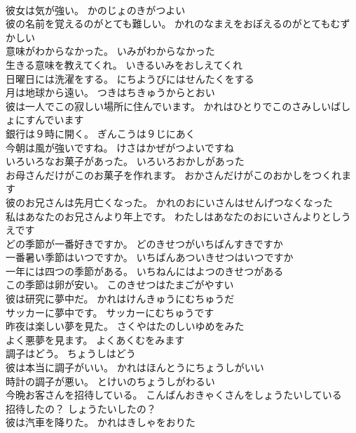 \documentclass[8pt]{extreport}
\begin{document}
\begin{CJK}{UTF8}{min}
\\	彼女は気が強い。	かのじょのきがつよい 
\\	彼の名前を覚えるのがとても難しい。	かれのなまえをおぼえるのがとてもむずかしい 
\\	意味がわからなかった。	いみがわからなかった 
\\	生きる意味を教えてくれ。	いきるいみをおしえてくれ 
\\	日曜日には洗濯をする。	にちようびにはせんたくをする 
\\	月は地球から遠い。	つきはちきゅうからとおい 
\\	彼は一人でこの寂しい場所に住んでいます。	かれはひとりでこのさみしいばしょにすんでいます 
\\	銀行は９時に開く。	ぎんこうは９じにあく 
\\	今朝は風が強いですね。	けさはかぜがつよいですね 
\\	いろいろなお菓子があった。	いろいろおかしがあった 
\\	お母さんだけがこのお菓子を作れます。	おかさんだけがこのおかしをつくれます 
\\	彼のお兄さんは先月亡くなった。	かれのおにいさんはせんげつなくなった 
\\	私はあなたのお兄さんより年上です。	わたしはあなたのおにいさんよりとしうえです 
\\	どの季節が一番好きですか。	どのきせつがいちばんすきですか 
\\	一番暑い季節はいつですか。	いちばんあついきせつはいつですか 
\\	一年には四つの季節がある。	いちねんにはよつのきせつがある 
\\	この季節は卵が安い。	このきせつはたまごがやすい 
\\	彼は研究に夢中だ。	かれはけんきゅうにむちゅうだ 
\\	サッカーに夢中です。	サッカーにむちゅうです 
\\	昨夜は楽しい夢を見た。	さくやはたのしいゆめをみた 
\\	よく悪夢を見ます。	よくあくむをみます 
\\	調子はどう。	ちょうしはどう 
\\	彼は本当に調子がいい。	かれはほんとうにちょうしがいい 
\\	時計の調子が悪い。	とけいのちょうしがわるい 
\\	今晩お客さんを招待している。	こんばんおきゃくさんをしょうたいしている 
\\	招待したの？	しょうたいしたの？ 
\\	彼は汽車を降りた。	かれはきしゃをおりた 

\end{CJK}
\end{document}
